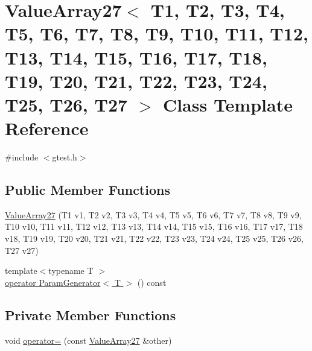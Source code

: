 \hypertarget{classtesting_1_1internal_1_1ValueArray27}{\section{\-Value\-Array27$<$ \-T1, \-T2, \-T3, \-T4, \-T5, \-T6, \-T7, \-T8, \-T9, \-T10, \-T11, \-T12, \-T13, \-T14, \-T15, \-T16, \-T17, \-T18, \-T19, \-T20, \-T21, \-T22, \-T23, \-T24, \-T25, \-T26, \-T27 $>$ \-Class \-Template \-Reference}
\label{d9/ddf/classtesting_1_1internal_1_1ValueArray27}
}


{\ttfamily \#include $<$gtest.\-h$>$}

\subsection*{\-Public \-Member \-Functions}
\begin{DoxyCompactItemize}
\item 
\hyperlink{classtesting_1_1internal_1_1ValueArray27_a804ab8a3b079dc81ab59e6faf5640c6c}{\-Value\-Array27} (\-T1 v1, \-T2 v2, \-T3 v3, \-T4 v4, \-T5 v5, \-T6 v6, \-T7 v7, \-T8 v8, \-T9 v9, \-T10 v10, \-T11 v11, \-T12 v12, \-T13 v13, \-T14 v14, \-T15 v15, \-T16 v16, \-T17 v17, \-T18 v18, \-T19 v19, \-T20 v20, \-T21 v21, \-T22 v22, \-T23 v23, \-T24 v24, \-T25 v25, \-T26 v26, \-T27 v27)
\item 
{\footnotesize template$<$typename T $>$ }\\\hyperlink{classtesting_1_1internal_1_1ValueArray27_a08ef46fa12c9dd8ef6fc630baeea89b7}{operator Param\-Generator$<$ T $>$} () const 
\end{DoxyCompactItemize}
\subsection*{\-Private \-Member \-Functions}
\begin{DoxyCompactItemize}
\item 
void \hyperlink{classtesting_1_1internal_1_1ValueArray27_a0c33040115c546826f8e4109ce9515ca}{operator=} (const \hyperlink{classtesting_1_1internal_1_1ValueArray27}{\-Value\-Array27} \&other)
\end{DoxyCompactItemize}
